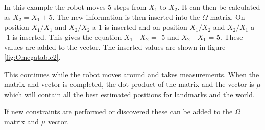 \FloatBarrier


In this example the robot moves 5 steps from $X_1$ to $X_2$. It can then be calculated as $X_2 = X_1 + 5$. The new information is then inserted into the $\Omega$ matrix. On position $X_1/X_1$ and $X_2/X_2$ a 1 is inserted and on position $X_1/X_2$ and $X_2/X_1$ a -1 is inserted. This gives the equation $X_1$ - $X_2$ = -5 and $X_2$ - $X_1$ = 5. These values are added to the vector. The inserted values are shown in figure \ref{fig:Omegatable2}.


This continues while the robot moves around and takes measurements. When the matrix and vector is completed, the dot product of the matrix and the vector is $\mu$ which will contain all the best estimated positions for landmarks and the world.

If new constraints are performed or discovered these can be added to the $\Omega$ matrix and $\mu$ vector.